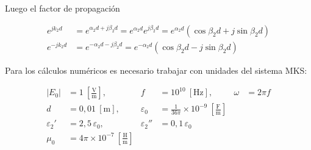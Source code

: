 \documentclass[
  11pt,
  letterpaper,
   addpoints,
   answers
  ]{exam}
\begin{document}
\begin{questions}
\begin{solution}
\begin{enumerate}
Luego el factor de propagación

\begin{align}
e^{j k_2 d} &= e^{\alpha_2 d + j \beta_2 d} = e^{\alpha_2 d} e^{j \beta_2 d} = e^{\alpha_2 d} (\cos \beta_2 d + j \sin \beta_2 d) \\
e^{-j k_2 d} &= e^{-\alpha_2 d - j \beta_2 d} = e^{-\alpha_2 d} (\cos \beta_2 d - j \sin \beta_2 d)
\end{align}


Para los cálculos numéricos es necesario trabajar con unidades del sistema MKS:

\begin{align*}
|E_0| &= 1\ \left[\frac{\text{V}}{\text{m}}\right], & f &= 10^{10}\ [\text{Hz}], & \omega &= 2 \pi f \\
d &= 0{,}01\ [\text{m}], & \varepsilon_0 &= \frac{1}{36\pi} \times 10^{-9}\ \left[\frac{\text{F}}{\text{m}}\right] \\
\varepsilon_2' &= 2{,}5\, \varepsilon_0, & \varepsilon_2'' &= 0{,}1\, \varepsilon_0 \\
\mu_0 &= 4\pi \times 10^{-7}\ \left[\frac{\text{H}}{\text{m}}\right]
\end{align*}

         \end{enumerate}
    \end{solution}
     
    
\end{questions}
\newpage
\end{document}
